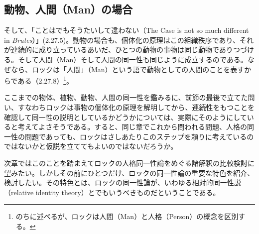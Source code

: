 \documentclass[a4j,oneside]{jsbook}
\begin{document}
\subsection*{
動物、人間（Man）の場合
}
そして、「ことはでもそうたいして違わない（The Case is not so much different in {\itshape Brutes}）」(2.27.5)。動物の場合も、個体化の原理はこの組織秩序であり、それが連続的に成り立っているあいだ、ひとつの動物の事物は同じ動物でありつづける。そして人間（Man）そして人間の同一性も同じように成立するのである。なぜなら、ロックは「人間」（Man）という語で動物としての人間のことを表すからである（2.27.8）\footnote{のちに述べるが、ロックは人間（Man）と人格（Person）の概念を区別する。}。
\par
ここまでの物体、植物、動物、人間の同一性を鑑みるに、前節の最後で立てた問い、すなわちロックは事物の個体化の原理を解明してから、連続性をもつことを確認して同一性の説明としているかどうかについては、実際にそのようにしていると考えてよさそうである。すると、同じ章でこれから問われる問題、人格の同一性の問題であっても、ロックはさしあたりこのステップを頼りに考えているのではないかと仮説を立ててもよいのではないだろうか。
\par
次章ではこのことを踏まえてロックの人格同一性論をめぐる諸解釈の比較検討に望みたい。しかしその前にひとつだけ、ロックの同一性論の重要な特色を紹介、検討したい。その特色とは、ロックの同一性論が、いわゆる相対的同一性説（relative identity theory）とでもいうべきものだということである。
\end{document}
